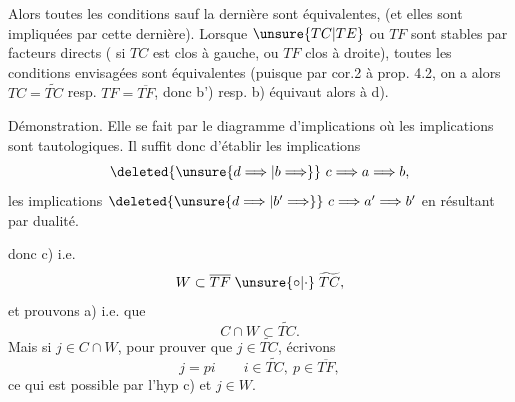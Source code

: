 Alors toutes les conditions sauf la dernière sont équivalentes, (et elles sont  impliquées par cette dernière).
 Lorsque $\unsure{TC|TE}$ ou $TF$ sont stables par facteurs directs ( si $TC$ est clos à gauche, ou $TF$ clos à droite), toutes les conditions envisagées sont équivalentes (puisque par cor.2 à prop. 4.2, on a alors $TC=\widetilde{TC}$ resp. $TF=\overline{TF}$, donc b') resp. b) équivaut alors à d).

Démonstration. Elle se fait par le diagramme d'implications
où les  implications   sont tautologiques. Il suffit donc d'établir les  implications
\[
\deleted{\unsure{d\Longrightarrow|b\Longrightarrow}}\ c\Longrightarrow a\Longrightarrow b,
\]
les implications $\deleted{\unsure{d\Longrightarrow|b'\Longrightarrow}}\ c\Longrightarrow a'\Longrightarrow b'$ en résultant par dualité. 

  donc c) i.e.
\[
W\subset\overline{TF}\mathrel{\unsure{\circ|\cdot}}\widetilde{TC},
\]
et prouvons a) i.e. que
\[
C\cap W\subset\widetilde{TC}.
\]
Mais si $j\in C\cap W$, pour prouver que $j\in\widetilde{TC}$, écrivons
\[
j=pi\qquad i\in\widetilde{TC},\ p\in\overline{TF},
\]
ce qui est possible par l'hyp c) et $j\in W$.
